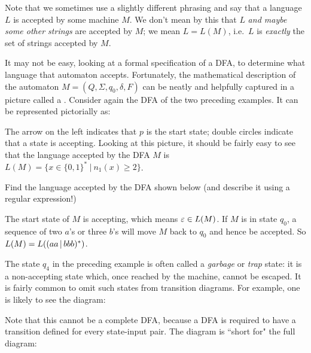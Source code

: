 \smallskip
Note that we sometimes use a slightly different phrasing and say that a language
$L$ is accepted by some machine $M$.  We don't mean by this that $L$ {\em and
maybe some other strings} are accepted by $M$; we mean $L = L(M)$, i.e.\ $L$ is
{\em exactly} the set of strings accepted by $M$.

It may not be easy, looking at a formal specification of a DFA, to determine what
language that automaton accepts.  Fortunately, the mathematical description of
the automaton $M=(Q, \Sigma, q_0, \delta, F)$ can be neatly and helpfully
captured in a picture called a .  
Consider again the DFA of the two preceding examples.  It
can be represented pictorially as:


\noindent The arrow on the left indicates that $p$ is the start state; double
circles indicate that a state is accepting.  Looking at this picture, it should
be fairly easy to see that the language accepted by the DFA $M$ is 
$L(M) = \{ x \in \{0,1\}^* \ | \ n_1(x) \geq 2\}$.

\begin{example}
Find the language accepted by the DFA shown below (and describe it using a
regular expression!)


The start state of $M$ is accepting, which means $\varepsilon \in L(M)$.  If $M$ is
in state $q_0$, a
sequence of two $a$'s or three $b$'s will move $M$ back to $q_0$ and hence
be accepted.  So $L(M) = L((aa\hbox{$\,|\,$} bbb)^*)$.
\end{example}

The state $q_4$ in the preceding example is often called a {\em garbage} or {\em
trap} state: it is a non-accepting state which, once reached by the machine,
cannot be escaped.  It is fairly common to omit such states from transition
diagrams.  For example, one is likely to see the diagram:


Note that this cannot be a complete DFA, because a DFA is required to have a
transition defined for every state-input pair.  The diagram is ``short for" the
full diagram:



